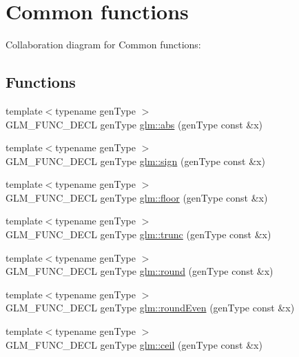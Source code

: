 \hypertarget{group__core__func__common}{}\section{Common functions}
\label{group__core__func__common}
Collaboration diagram for Common functions\+:
\subsection*{Functions}
\begin{DoxyCompactItemize}
\item 
{\footnotesize template$<$typename gen\+Type $>$ }\\G\+L\+M\+\_\+\+F\+U\+N\+C\+\_\+\+D\+E\+C\+L gen\+Type \hyperlink{group__core__func__common_gaea946f96ec1df259802effe9f532e1c1}{glm\+::abs} (gen\+Type const \&x)
\item 
{\footnotesize template$<$typename gen\+Type $>$ }\\G\+L\+M\+\_\+\+F\+U\+N\+C\+\_\+\+D\+E\+C\+L gen\+Type \hyperlink{group__core__func__common_gaa7afd59ab947e313d41cb6d9c655a80c}{glm\+::sign} (gen\+Type const \&x)
\item 
{\footnotesize template$<$typename gen\+Type $>$ }\\G\+L\+M\+\_\+\+F\+U\+N\+C\+\_\+\+D\+E\+C\+L gen\+Type \hyperlink{group__core__func__common_ga86350252cc9bf86421317460bbd1f21c}{glm\+::floor} (gen\+Type const \&x)
\item 
{\footnotesize template$<$typename gen\+Type $>$ }\\G\+L\+M\+\_\+\+F\+U\+N\+C\+\_\+\+D\+E\+C\+L gen\+Type \hyperlink{group__core__func__common_gadb091aed51e45872f6dc841affa41c5c}{glm\+::trunc} (gen\+Type const \&x)
\item 
{\footnotesize template$<$typename gen\+Type $>$ }\\G\+L\+M\+\_\+\+F\+U\+N\+C\+\_\+\+D\+E\+C\+L gen\+Type \hyperlink{group__core__func__common_ga75ebab3fe88a9c5c769135cf5a2649ef}{glm\+::round} (gen\+Type const \&x)
\item 
{\footnotesize template$<$typename gen\+Type $>$ }\\G\+L\+M\+\_\+\+F\+U\+N\+C\+\_\+\+D\+E\+C\+L gen\+Type \hyperlink{group__core__func__common_ga6535952553479a4bbca7f1f12a011b17}{glm\+::round\+Even} (gen\+Type const \&x)
\item 
{\footnotesize template$<$typename gen\+Type $>$ }\\G\+L\+M\+\_\+\+F\+U\+N\+C\+\_\+\+D\+E\+C\+L gen\+Type \hyperlink{group__core__func__common_gab81e02fff55c9391e28fa47e68c3c903}{glm\+::ceil} (gen\+Type const \&x)

\end{DoxyCompactItemize}
